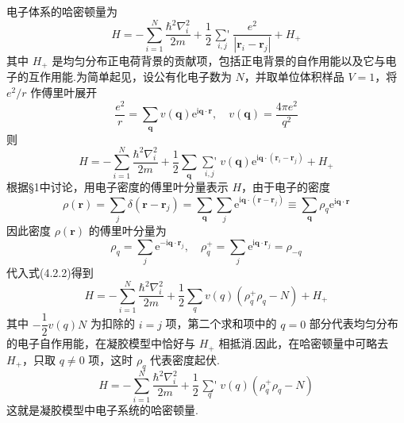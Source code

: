 电子体系的哈密顿量为
\begin{equation}
  H=-\sum_{i=1}^{N}\frac{\hbar^{2}\nabla_{i}^{2}}{2m}
  +\frac{1}{2}\mathop{{\sum}'}\limits_{i,j}\frac{e^{2}}{|\boldsymbol{r}_{i}-\boldsymbol{r}_{j}|}
  +H_{+}
\end{equation}
其中 $H_{+}$ 是均匀分布正电荷背景的贡献项，包括正电背景的自作用能以及它与电子的互作用能.为简单起见，设公有化电子数为 $N$，并取单位体积样品 $V=1$，将 $e^{2}/r$ 作傅里叶展开
\begin{equation*}
  \frac{e^{2}}{r}=\sum_{\boldsymbol{q}}v(\boldsymbol{q})\mathrm{e}^{\mathrm{i}\boldsymbol{q}\cdot\boldsymbol{r}},
  \quad v(\boldsymbol{q})=\frac{4\pi e^{2}}{q^{2}}
\end{equation*}
则
\begin{equation}
  H=-\sum_{i=1}^{N}\frac{\hbar^{2}\nabla_{i}^{2}}{2m}
  +\frac{1}{2}\sum_{\boldsymbol{q}}\mathop{{\sum}'}\limits_{i,j}
  v(\boldsymbol{q})\mathrm{e}^{\mathrm{i}\boldsymbol{q}\cdot(\boldsymbol{r}_{i}-\boldsymbol{r}_{j})}
  +H_{+}
\end{equation}
根据§1中讨论，用电子密度的傅里叶分量表示 $H$，由于电子的密度
\begin{equation}
  \rho(\boldsymbol{r})=\sum_{j}\delta(\boldsymbol{r}-\boldsymbol{r}_{j})
  =\sum_{\boldsymbol{q}}\sum_{j}\mathrm{e}^{\mathrm{i}\boldsymbol{q}\cdot(\boldsymbol{r}-\boldsymbol{r}_{j})}
  \equiv\sum_{\boldsymbol{q}}\rho_{q}\mathrm{e}^{\mathrm{i}\boldsymbol{q}\cdot\boldsymbol{r}}
\end{equation}
因此密度 $\rho(\boldsymbol{r})$ 的傅里叶分量为
\begin{equation}
  \rho_{q}=\sum_{j}\mathrm{e}^{-\mathrm{i}\boldsymbol{q}\cdot\boldsymbol{r}_{j}},\quad
  \rho_{q}^{+}=\sum_{j}\mathrm{e}^{\mathrm{i}\boldsymbol{q}\cdot\boldsymbol{r}_{j}}=\rho_{-q}
\end{equation}
代入式(4.2.2)得到
\begin{equation}
  H=-\sum_{i=1}^{N}\frac{\hbar^{2}\nabla_{i}^{2}}{2m}
  +\frac{1}{2}\sum_{q}v(q)\left(\rho_{q}^{+}\rho_{q}-N\right)+H_{+}
\end{equation}
其中 $-\dfrac{1}{2}v(q)N$ 为扣除的 $i=j$ 项，第二个求和项中的 $q=0$ 部分代表均匀分布的电子自作用能，在凝胶模型中恰好与 $H_{+}$ 相抵消.因此，在哈密顿量中可略去 $H_{+}$，只取 $q\neq 0$ 项，这时 $\rho_{q}$ 代表密度起伏.
\begin{equation}
  H=-\sum_{i=1}^{N}\frac{\hbar^{2}\nabla_{i}^{2}}{2m}
  +\frac{1}{2}\mathop{{\sum}'}\limits_{q}v(q)\left(\rho_{q}^{+}\rho_{q}-N\right)
\end{equation}
这就是凝胶模型中电子系统的哈密顿量.

